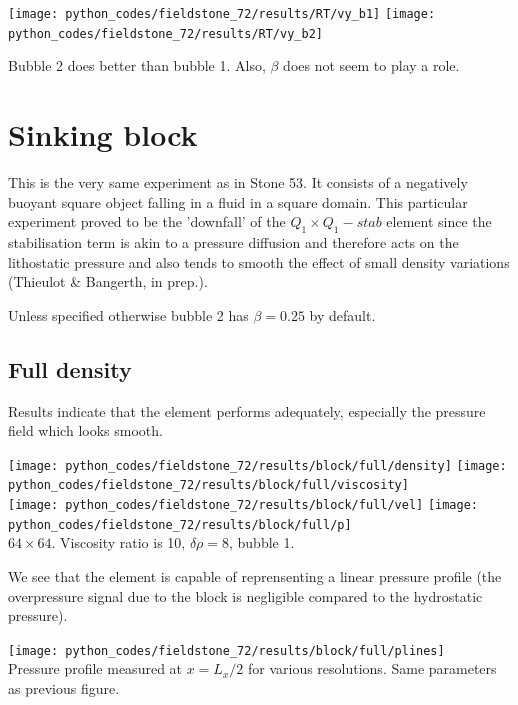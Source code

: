 \begin{center}
\texttt{[image: python\_codes/fieldstone\_72/results/RT/vy\_b1]}
\texttt{[image: python\_codes/fieldstone\_72/results/RT/vy\_b2]}
\end{center}

Bubble 2 does better than bubble 1. Also, $\beta$ does not seem to play a role.

\section*{Sinking block}
This is the very same experiment as in Stone 53. It consists of a negatively buoyant 
square object falling in a fluid in a square domain. 
This particular experiment proved to be the 'downfall' of the $Q_1\times Q_1-stab$ element
since the stabilisation term is akin to a pressure diffusion and therefore
acts on the lithostatic pressure and also tends to smooth the effect of small 
density variations (Thieulot \& Bangerth, in prep.). 

Unless specified otherwise bubble 2 has $\beta=0.25$ by default.

\subsection*{Full density} 
Results indicate that the element performs adequately, especially the 
pressure field which looks smooth.  

\begin{center}
\texttt{[image: python\_codes/fieldstone\_72/results/block/full/density]}
\texttt{[image: python\_codes/fieldstone\_72/results/block/full/viscosity]}\\
\texttt{[image: python\_codes/fieldstone\_72/results/block/full/vel]}
\texttt{[image: python\_codes/fieldstone\_72/results/block/full/p]}\\
{\captionfont $64\times 64$. Viscosity ratio is 10, $\delta \rho=8$, bubble 1.}
\end{center}

We see that the element is capable of reprensenting a linear pressure profile
(the overpressure signal due to the block is negligible compared to the 
hydrostatic pressure).

\begin{center}
\texttt{[image: python\_codes/fieldstone\_72/results/block/full/plines]}\\
{\captionfont Pressure profile measured at $x=L_x/2$ for various resolutions. Same parameters
as previous figure.}
\end{center}

